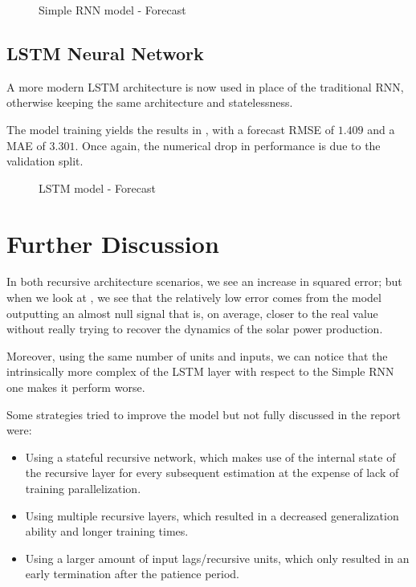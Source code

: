 \documentclass{scrartcl}
\begin{document}
    \begin{figure}[ht]
      \centering
      
      \caption{Simple RNN model - Forecast}
      \label{fig:rnn_fit}
    \end{figure}

  \subsection{LSTM Neural Network}
    
    A more modern LSTM architecture is now used in place of the traditional RNN, otherwise keeping the same architecture and statelessness.

    The model training yields the results in , with a forecast RMSE of $1.409$ and a MAE of $3.301$. Once again, the numerical drop in performance is due to the validation split.

    \begin{figure}[ht]
      \centering
      
      \caption{LSTM model - Forecast}
      \label{fig:lstm_fit}
    \end{figure}

\section{Further Discussion}

  In both recursive architecture scenarios, we see an increase in squared error; but when we look at , we see that the relatively low error comes from the model outputting an almost null signal that is, on average, closer to the real value without really trying to recover the dynamics of the solar power production.

  Moreover, using the same number of units and inputs, we can notice that the intrinsically more complex of the LSTM layer with respect to the Simple RNN one makes it perform worse.

  Some strategies tried to improve the model but not fully discussed in the report were:
  \begin{itemize}
    \item Using a stateful recursive network, which makes use of the internal state of the recursive layer for every subsequent estimation at the expense of lack of training parallelization.
    \item Using multiple recursive layers, which resulted in a decreased generalization ability and longer training times.
    \item Using a larger amount of input lags/recursive units, which only resulted in an early termination after the patience period.
  \end{itemize}
\end{document}
